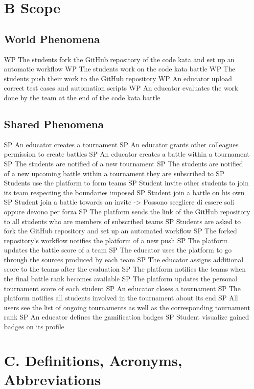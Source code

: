 \blindtext
\section{B Scope}

\subsection{World Phenomena}
WP The students fork the GitHub repository of the code kata and set up an automatic workflow
WP The students work on the code kata battle
WP The students push their work to the GitHub repository
WP An educator upload correct test cases and automation scripts
WP An educator evaluates the work done by the team at the end of the code kata battle

\subsection{Shared Phenomena}
SP An educator creates a tournament
SP An educator grants other colleagues permission to create battles
SP An educator creates a battle within a tournament
SP The students are notified of a new tournament
SP The students are notified of a new upcoming battle within a tournament they are subscribed to
SP Students use the platform to form teams
SP Student invite other students to join its team respecting the boundaries imposed
SP Student join a battle on his own
SP Student join a battle towards an invite -> Possono scegliere di essere soli oppure devono per forza
SP The platform sends the link of the GitHub repository to all students who are members of subscribed teams
SP Students are asked to fork the GitHub repository and set up an automated workflow
SP The forked repository's workflow notifies the platform of a new push
SP The platform updates the battle score of a team
SP The educator uses the platform to go through the sources produced by each team
SP The educator assigns additional score to the teams after the evaluation
SP The platform notifies the teams when the final battle rank becomes available
SP The platform updates the personal tournament score of each student
SP An educator closes a tournament
SP The platform notifies all students involved in the tournament about its end
SP All users see the list of  ongoing tournaments as well as the corresponding tournament rank
SP An educator defines the gamification badges
SP Student visualize gained badges on its profile

\section{C. Definitions, Acronyms, Abbreviations}
